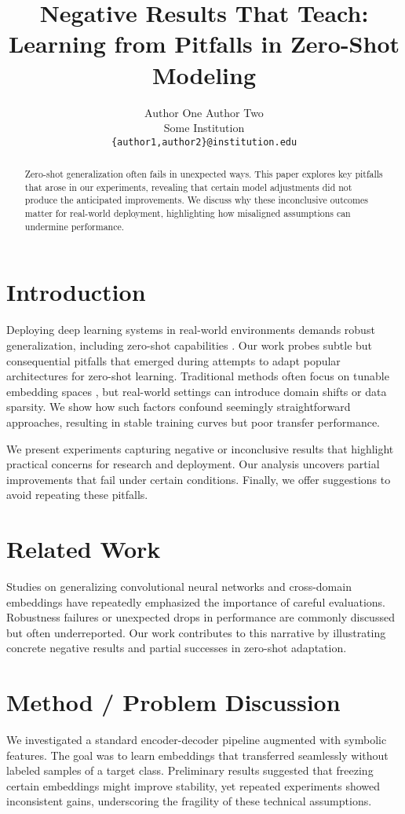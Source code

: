 \documentclass{article}
\title{Negative Results That Teach: Learning from Pitfalls in Zero-Shot Modeling}
\author{Author One \quad Author Two \\
{\normalsize Some Institution} \\
{\normalsize \texttt{\{author1,author2\}@institution.edu}}
}
\date{}
\begin{document}
\maketitle

\begin{abstract}
Zero-shot generalization often fails in unexpected ways. This paper explores key pitfalls that arose in our experiments, revealing that certain model adjustments did not produce the anticipated improvements. We discuss why these inconclusive outcomes matter for real-world deployment, highlighting how misaligned assumptions can undermine performance.
\end{abstract}

\section{Introduction}
Deploying deep learning systems in real-world environments demands robust generalization, including zero-shot capabilities \citep{He2016}. Our work probes subtle but consequential pitfalls that emerged during attempts to adapt popular architectures for zero-shot learning. Traditional methods often focus on tunable embedding spaces \citep{CireGAN2016}, but real-world settings can introduce domain shifts or data sparsity. We show how such factors confound seemingly straightforward approaches, resulting in stable training curves but poor transfer performance.

We present experiments capturing negative or inconclusive results that highlight practical concerns for research and deployment. Our analysis uncovers partial improvements that fail under certain conditions. Finally, we offer suggestions to avoid repeating these pitfalls.

\section{Related Work}
Studies on generalizing convolutional neural networks \citep{He2016} and cross-domain embeddings \citep{CireGAN2016} have repeatedly emphasized the importance of careful evaluations. Robustness failures or unexpected drops in performance are commonly discussed but often underreported. Our work contributes to this narrative by illustrating concrete negative results and partial successes in zero-shot adaptation.

\section{Method / Problem Discussion}
We investigated a standard encoder-decoder pipeline augmented with symbolic features. The goal was to learn embeddings that transferred seamlessly without labeled samples of a target class. Preliminary results suggested that freezing certain embeddings might improve stability, yet repeated experiments showed inconsistent gains, underscoring the fragility of these technical assumptions.
\end{document}
